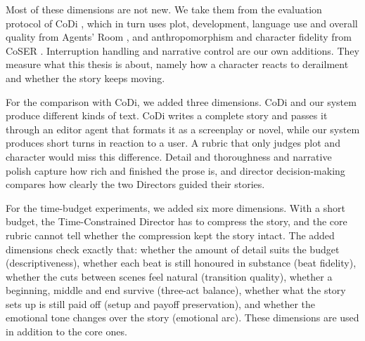 Most of these dimensions are not new. We take them from the evaluation protocol of CoDi \cite{kim2025codi}, which in turn uses plot, development, language use and overall quality from Agents' Room \cite{huot2025agents}, and anthropomorphism and character fidelity from CoSER \cite{wang2025coser}. Interruption handling and narrative control are our own additions. They measure what this thesis is about, namely how a character reacts to derailment and whether the story keeps moving.

For the comparison with CoDi, we added three dimensions. CoDi and our system produce different kinds of text. CoDi writes a complete story and passes it through an editor agent that formats it as a screenplay or novel, while our system produces short turns in reaction to a user. A rubric that only judges plot and character would miss this difference. Detail and thoroughness and narrative polish capture how rich and finished the prose is, and director decision-making compares how clearly the two Directors guided their stories.

For the time-budget experiments, we added six more dimensions. With a short budget, the Time-Constrained Director has to compress the story, and the core rubric cannot tell whether the compression kept the story intact. The added dimensions check exactly that: whether the amount of detail suits the budget (descriptiveness), whether each beat is still honoured in substance (beat fidelity), whether the cuts between scenes feel natural (transition quality), whether a beginning, middle and end survive (three-act balance), whether what the story sets up is still paid off (setup and payoff preservation), and whether the emotional tone changes over the story (emotional arc). These dimensions are used in addition to the core ones.

